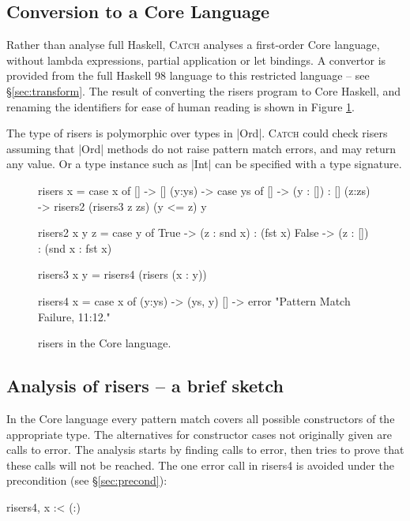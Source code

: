 \documentclass[preprint]{sigplanconf}
\newcommand{\C}[1]{\textsf{#1}}
\newcommand{\catch}{\textsc{Catch}}
\begin{document}
\subsection{Conversion to a Core Language}

Rather than analyse full Haskell, \catch{} analyses a first-order Core language, without lambda expressions, partial application or let bindings. A convertor is provided from the full Haskell 98 language to this restricted language -- see \S\ref{sec:transform}. The result of converting the \C{risers} program to Core Haskell, and renaming the identifiers for ease of human reading is shown in Figure \ref{fig:risers_core}.

The type of \C{risers} is polymorphic over types in |Ord|. \catch{} could check \C{risers} assuming that |Ord| methods do not raise pattern match errors, and may return any value. Or a type instance such as |Int| can be specified with a type signature.

\begin{figure}
\begin{code}
risers x = case x of
    [] -> []
    (y:ys) ->  case ys of
         [] -> (y : []) : []
         (z:zs) -> risers2 (risers3 z zs) (y <= z) y

risers2 x y z =  case y of
    True -> (z : snd x) : (fst x)
    False -> (z : []) : (snd x : fst x)

risers3 x y = risers4 (risers (x : y))

risers4 x = case x of
    (y:ys) -> (ys, y)
    [] -> error "Pattern Match Failure, 11:12."
\end{code}
\caption{\C{risers} in the Core language.}
\label{fig:risers_core}
\end{figure}

\subsection{Analysis of \C{risers} -- a brief sketch}

In the Core language every pattern match covers all possible constructors of the appropriate type. The alternatives for constructor cases not originally given are calls to \C{error}. The analysis starts by finding calls to \C{error}, then tries to prove that these calls will not be reached. The one \C{error} call in \C{risers4} is avoided under the precondition (see \S\ref{sec:precond}):

\begin{code}
risers4, x :< (:)
\end{code}
\end{document}
